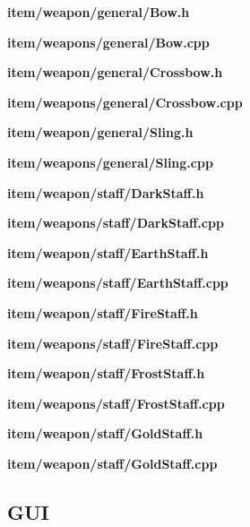 \documentclass[../Main.tex]{subfiles}
\begin{document}
            \textbf{item/weapon/general/Bow.h}
            
            \textbf{item/weapons/general/Bow.cpp}
            

            \textbf{item/weapon/general/Crossbow.h}
            
            \textbf{item/weapons/general/Crossbow.cpp}
            

            \textbf{item/weapon/general/Sling.h}
            
            \textbf{item/weapons/general/Sling.cpp}
            

            \textbf{item/weapon/staff/DarkStaff.h}
            
            \textbf{item/weapons/staff/DarkStaff.cpp}
            

            \textbf{item/weapon/staff/EarthStaff.h}
            
            \textbf{item/weapons/staff/EarthStaff.cpp}
            

            \textbf{item/weapon/staff/FireStaff.h}
            
            \textbf{item/weapons/staff/FireStaff.cpp}
            

            \textbf{item/weapon/staff/FrostStaff.h}
            
            \textbf{item/weapons/staff/FrostStaff.cpp}
            

            \textbf{item/weapon/staff/GoldStaff.h}
            
            \textbf{item/weapon/staff/GoldStaff.cpp}
            

    \subsection{GUI}
\end{document}
